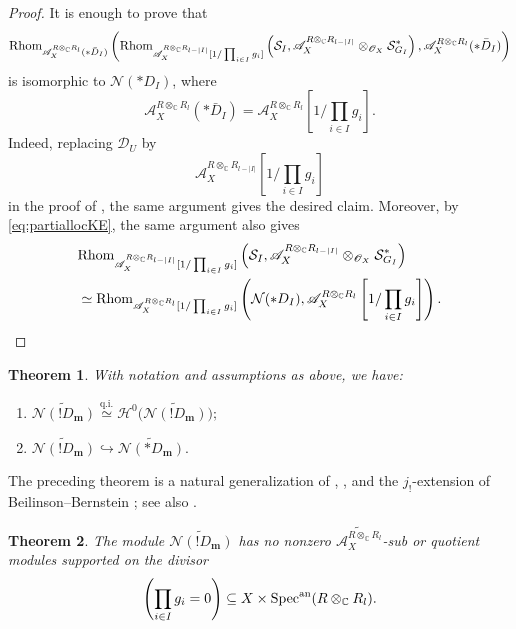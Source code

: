 \documentclass{amsart}
\theoremstyle{plain}
\newtheorem{theorem}{Theorem}
\numberwithin{theorem}{section}
\theoremstyle{definition}
\theoremstyle{remark}
\theoremstyle{definition}
\newcommand{\wt}{\widetilde}
\newcommand{\C}{\mathbb{C}} %
\newcommand{\cH}{\mathcal{H}}
\newcommand{\cN}{\mathcal{N}}
\newcommand{\cO}{\mathscr{O}}
\newcommand{\cS}{\mathcal{S}}
\newcommand{\bm}{\mathbf{m}}
\newcommand{\sA}{\mathscr{A}}
\newcommand{\shD}{\mathscr{D}}
\newcommand{\Specan}{\textup{Spec}^{\textup{an}}}
\newcommand{\Rhom}{\textup{Rhom}}
\begin{document}
\begin{proof}
It is enough to prove that
\[
\Rhom_{\sA_X^{R\otimes_\C R_l}(*\bar D_I)}
\left(
\Rhom_{\sA_X^{R\otimes_\C R_{l-|I|}}
[1/\prod_{i\in I}g_i]}
\left(
\cS_I,
\sA_X^{R\otimes_\C R_{l-|I|}}\otimes_{\cO_X}\cS_{G_I}^*
\right),
\sA_X^{R\otimes_\C R_l}(*\bar D_I)
\right)
\]
is isomorphic to $\cN(*D_I)$, where
\[
\sA_X^{R\otimes_\C R_l}(*\bar D_I)
=
\sA_X^{R\otimes_\C R_l}
\left[1/\prod_{i\in I}g_i\right].
\]
Indeed, replacing $\shD_U$ by
\[
\sA_X^{R\otimes_\C R_{l-|I|}}
\left[1/\prod_{i\in I}g_i\right]
\]
in the proof of \cite[Lem.5.3.1]{BVWZ2}, the same argument gives the desired
claim. Moreover, by \eqref{eq:partiallocKE}, the same argument also gives
\begin{equation}\label{eq:isolocdualKE}
\begin{split}
&
\Rhom_{\sA_X^{R\otimes_\C R_{l-|I|}}
[1/\prod_{i\in I}g_i]}
\left(
\cS_I,
\sA_X^{R\otimes_\C R_{l-|I|}}\otimes_{\cO_X}\cS_{G_I}^*
\right)
\\
&\simeq
\Rhom_{\sA_X^{R\otimes_\C R_l}
[1/\prod_{i\in I}g_i]}
\left(
\cN(*D_I),
\sA_X^{R\otimes_\C R_l}
\left[1/\prod_{i\in I}g_i\right]
\right).
\end{split}
\end{equation}
\end{proof}

\begin{theorem}\label{thm:anarelbeilinson}
With notation and assumptions as above, we have:
\begin{enumerate}[label=$(\arabic*)$]
    \item
    $\wt{\cN(!D_\bm)}
    \stackrel{\mathrm{q.i.}}{\simeq}
    \cH^0\big(\wt{\cN(!D_\bm)}\big);$
    \item
    $\wt{\cN(!D_\bm)}
    \hookrightarrow
    \wt{\cN(*D_\bm)}.$
\end{enumerate}
\end{theorem}

The preceding theorem is a natural generalization of \cite[Lem.2.7]{WuRHA},
\cite[Thm.5.3]{WZ}, and the $j_!$-extension of Beilinson--Bernstein
\cite{BBJats}; see also \cite[Prop.3.8.3]{Gil}.

\begin{theorem}\label{thm:relminext}
The module $\wt{\cN(!D_\bm)}$ has no nonzero
$\wt{\sA_X^{R\otimes_\C R_l}}$-sub or quotient modules supported on the
divisor
\[
\left(\prod_{i\in I}g_i=0\right)
\subseteq
X\times \Specan(R\otimes_\C R_l).
\]
\end{theorem}
\end{document}
